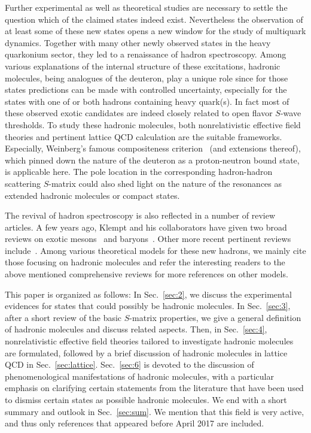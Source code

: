 Further experimental as well as theoretical studies are necessary to settle the
question which of the claimed states indeed exist.
Nevertheless the observation of at least some of these new states opens a new
window for the study of multiquark dynamics. Together with many other newly
observed states in the heavy quarkonium sector, they led to a renaissance of
hadron spectroscopy.
Among various explanations of the internal structure of these excitations,
hadronic molecules, being analogues of the deuteron, play a unique role since
for those states predictions can be made with controlled uncertainty, especially
for the states with one of or both hadrons containing heavy quark(s).
In fact most of these observed exotic candidates are indeed closely related to
open flavor $S$-wave thresholds. To study these hadronic molecules, both
nonrelativistic effective field theories and pertinent lattice QCD calculation
are the suitable frameworks. Especially,  Weinberg's famous compositeness
criterion~\cite{Weinberg:1962hj,Weinberg:1963zza} (and extensions thereof),
which pinned down the nature of the deuteron as a proton-neutron bound state, is
applicable here. The pole location in the corresponding hadron-hadron scattering
$S$-matrix could also shed light on the nature of the resonances as extended
hadronic molecules or compact states.

The revival of hadron spectroscopy is also reflected in a number of review
articles.
A few years ago, Klempt and his collaborators have given two broad reviews on
exotic mesons~\cite{Klempt:2007cp} and baryons~\cite{Klempt:2009pi}.
Other more recent pertinent reviews
include~\cite{Brambilla:2010cs,Olsen:2014qna,Oset:2016lyh,Chen:2016qju,
Chen:2016spr,Esposito:2016noz, Lebed:2016hpi,Hosaka:2016pey,Dong:2017gaw,Olsen:2017bmm}. Among
various theoretical models for these new hadrons, we
mainly cite those focusing on hadronic molecules and refer the interesting
readers to the above mentioned comprehensive reviews for more references on
other models.

This paper is organized as follows: In Sec.~\ref{sec:2}, we discuss the
experimental evidences for states that could possibly be hadronic molecules. In
Sec.~\ref{sec:3}, after a short review of the basic $S$-matrix properties, we
give a general definition of hadronic molecules and discuss related aspects.
Then, in Sec.~\ref{sec:4}, nonrelativistic effective field theories tailored to
investigate hadronic molecules are formulated, followed by a brief discussion of
hadronic molecules in lattice QCD in Sec.~\ref{sec:lattice}. Sec.~\ref{sec:6} is
devoted to the discussion of phenomenological manifestations of hadronic
molecules, with a particular emphasis on clarifying certain statements from the
literature that have been used to dismiss certain states as possible hadronic
molecules. We end with a short summary and outlook in Sec.~\ref{sec:sum}.  We
mention that this field is very active, and thus only references that appeared
before April 2017 are included.




